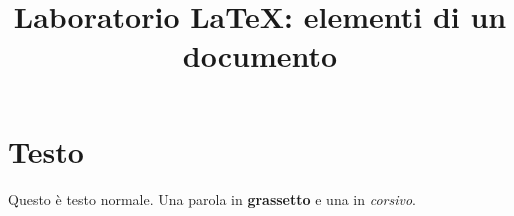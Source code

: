 \documentclass[a4paper,11pt]{article} %
\title{Laboratorio LaTeX: elementi di un documento} %
\author{} %
\date{} %
\begin{document}
\maketitle %
\tableofcontents %

%

\section{Testo}\label{sec:testo} %
Questo è testo normale. %
Una parola in \textbf{grassetto} %
e una in \textit{corsivo}. %
\end{document}
